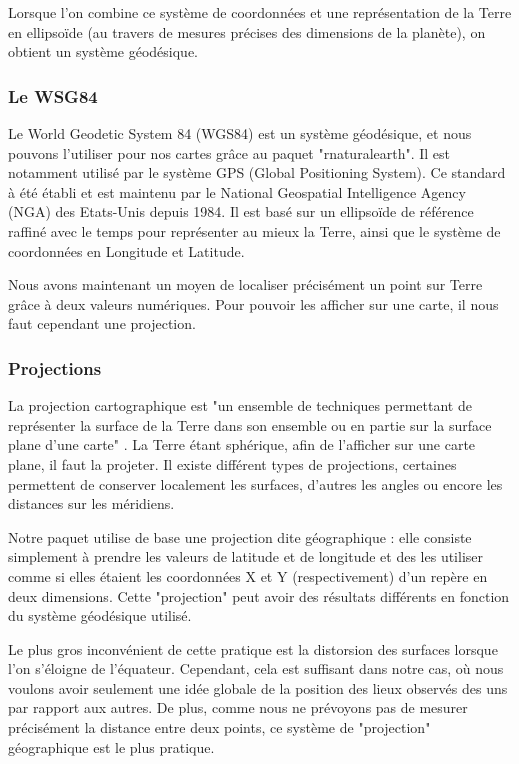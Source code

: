 \documentclass{article}
\begin{document}
Lorsque l'on combine ce système de coordonnées et une représentation de la Terre en ellipsoïde (au travers de mesures précises des dimensions de la planète), on obtient un système géodésique.

\subsubsection{Le WSG84}

Le World Geodetic System 84 (WGS84) est un système géodésique, et nous pouvons l'utiliser pour nos cartes grâce au paquet "rnaturalearth". Il est notamment utilisé par le système GPS (Global Positioning System). Ce standard à été établi et est maintenu par le National Geospatial Intelligence Agency (NGA) des Etats-Unis \cite{enwiki:1065796786} depuis 1984. Il est basé sur un ellipsoïde de référence raffiné avec le temps pour représenter au mieux la Terre, ainsi que le système de coordonnées en Longitude et Latitude.

Nous avons maintenant un moyen de localiser précisément un point sur Terre grâce à deux valeurs numériques. Pour pouvoir les afficher sur une carte, il nous faut cependant une projection.

\subsubsection{Projections}

La projection cartographique est "un ensemble de techniques permettant de représenter la surface de la Terre dans son ensemble ou en partie sur la surface plane d'une carte" \cite{frwiki:181713838}. La Terre étant sphérique, afin de l'afficher sur une carte plane, il faut la projeter. Il existe différent types de projections, certaines permettent de conserver localement les surfaces, d'autres les angles ou encore les distances sur les méridiens. 

Notre paquet utilise de base une projection dite géographique : elle consiste simplement à prendre les valeurs de latitude et de longitude et des les utiliser comme si elles étaient les coordonnées X et Y (respectivement) d'un repère en deux dimensions. Cette "projection" peut avoir des résultats différents en fonction du système géodésique utilisé. 

Le plus gros inconvénient de cette pratique est la distorsion des surfaces lorsque l'on s'éloigne de l'équateur. Cependant, cela est suffisant dans notre cas, où nous voulons avoir seulement une idée globale de la position des lieux observés des uns par rapport aux autres. De plus, comme nous ne prévoyons pas de mesurer précisément la distance entre deux points, ce système de "projection" géographique est le plus pratique.
\end{document}
